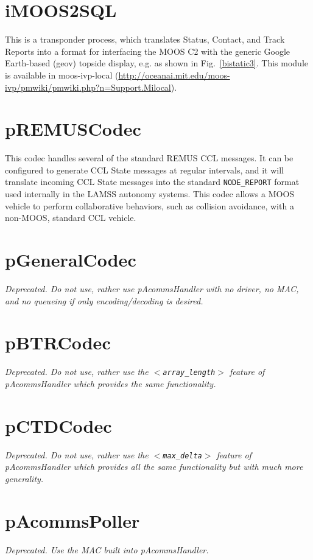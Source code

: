 \documentclass[11pt, letterpaper, oneside]{memoir}
\newcommand{\xmltag}[1]{\texttt{$<$#1$>$}}
\begin{document}
 
\section{iMOOS2SQL}

This is a transponder process, which translates Status, Contact, and
Track Reports into a format for interfacing the MOOS C2 with the
generic Google Earth-based (geov) topside display, e.g. as shown in
Fig.~\ref{bistatic3}. This module is available in moos-ivp-local (\url{http://oceanai.mit.edu/moos-ivp/pmwiki/pmwiki.php?n=Support.Milocal}).

\section{pREMUSCodec}

This codec handles several of the standard REMUS CCL messages. It can be configured to generate CCL State messages at regular
intervals, and it will translate incoming CCL State messages into the
standard \verb|NODE_REPORT| format used internally in the LAMSS autonomy
systems. This codec allows a MOOS vehicle to perform collaborative
behaviors, such as collision avoidance, with a non-MOOS, standard CCL vehicle.

\section{pGeneralCodec}

\textit{Deprecated. Do not use, rather use pAcommsHandler with no driver, no MAC, and no queueing if only encoding/decoding is desired.}

\section{pBTRCodec}

\textit{Deprecated. Do not use, rather use the \xmltag{array\_length} feature of pAcommsHandler which provides the same functionality.}

\section{pCTDCodec}

\textit{Deprecated. Do not use, rather use the \xmltag{max\_delta} feature of pAcommsHandler which provides all the same functionality but with much more generality. }

\section{pAcommsPoller}

\textit{Deprecated. Use the MAC built into pAcommsHandler. }




\end{document}
